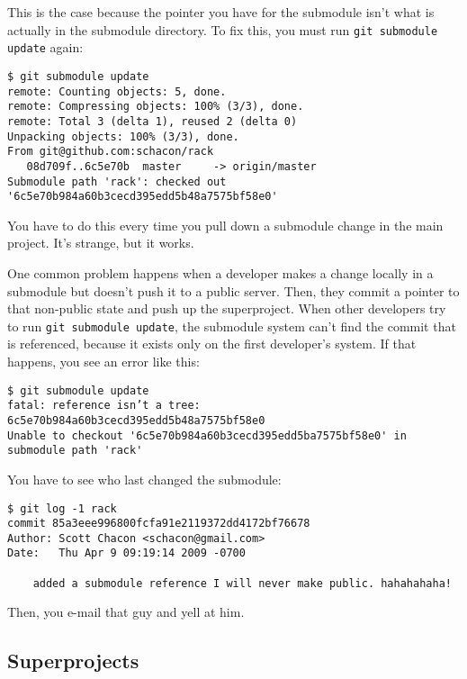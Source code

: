 \documentclass[a4paper]{book}
\begin{document}
This is the case because the pointer you have for the submodule isn't what is actually in the submodule directory. To fix this, you must run \texttt{git submodule update} again:

\begin{shaded}\begin{verbatim}
$ git submodule update
remote: Counting objects: 5, done.
remote: Compressing objects: 100% (3/3), done.
remote: Total 3 (delta 1), reused 2 (delta 0)
Unpacking objects: 100% (3/3), done.
From git@github.com:schacon/rack
   08d709f..6c5e70b  master     -> origin/master
Submodule path 'rack': checked out '6c5e70b984a60b3cecd395edd5b48a7575bf58e0'
\end{verbatim}\end{shaded}

You have to do this every time you pull down a submodule change in the main project. It's strange, but it works.

One common problem happens when a developer makes a change locally in a submodule but doesn't push it to a public server. Then, they commit a pointer to that non-public state and push up the superproject. When other developers try to run \texttt{git submodule update}, the submodule system can't find the commit that is referenced, because it exists only on the first developer's system. If that happens, you see an error like this:

\begin{shaded}\begin{verbatim}
$ git submodule update
fatal: reference isn’t a tree: 6c5e70b984a60b3cecd395edd5b48a7575bf58e0
Unable to checkout '6c5e70b984a60b3cecd395edd5ba7575bf58e0' in submodule path 'rack'
\end{verbatim}\end{shaded}

You have to see who last changed the submodule:

\begin{shaded}\begin{verbatim}
$ git log -1 rack
commit 85a3eee996800fcfa91e2119372dd4172bf76678
Author: Scott Chacon <schacon@gmail.com>
Date:   Thu Apr 9 09:19:14 2009 -0700

    added a submodule reference I will never make public. hahahahaha!
\end{verbatim}\end{shaded}

Then, you e-mail that guy and yell at him.

\subsection{Superprojects}
\end{document}
